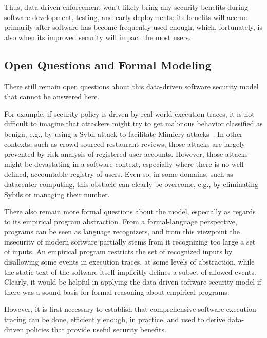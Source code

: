 \documentclass{IEEEtran}
\begin{document}
Thus, 
data-driven enforcement won't likely bring any security benefits
during software development, testing, and early deployments;
its benefits will accrue primarily after software has become frequently-used enough,
which, fortunately, is also when its improved security will impact the most users.



\subsection{Open Questions and Formal Modeling}
There still remain open questions
about this data-driven software security model that cannot be answered here.


For example, if security policy is driven by real-world execution traces,
it is not difficult to imagine that attackers might try to get malicious behavior
classified as benign, e.g., by using a Sybil attack to facilitate Mimicry attacks~\cite{Sybil,Mimicry}.
In other contexts, such as crowd-sourced restaurant reviews,
those attacks are  largely prevented by risk analysis of registered user accounts.
However, those attacks might be devastating in a software context,
especially where there is no well-defined, accountable registry of users.
Even so,
in some domains, such as datacenter computing,
this obstacle can clearly be overcome,
e.g., by eliminating Sybils or managing their number.


There also remain more formal questions 
about the model,
especially as regards to its empirical program abstraction.
From a formal-language perspective,
programs can be seen as language recognizers,
and from this viewpoint
the insecurity of
modern software partially stems from it recognizing too large a set of inputs.
An empirical program restricts the set of recognized inputs 
by disallowing some events in execution traces,
at some levels of abstraction,
while the static text of the software itself
implicitly defines a subset of allowed events. 
Clearly,
it would be helpful in applying the data-driven software security model
if there was a sound basis for formal reasoning about empirical programs.


However,
it is first necessary to establish
that comprehensive software execution tracing can be done, efficiently enough, in practice,
and used to derive data-driven policies that provide useful security benefits.
\end{document}
